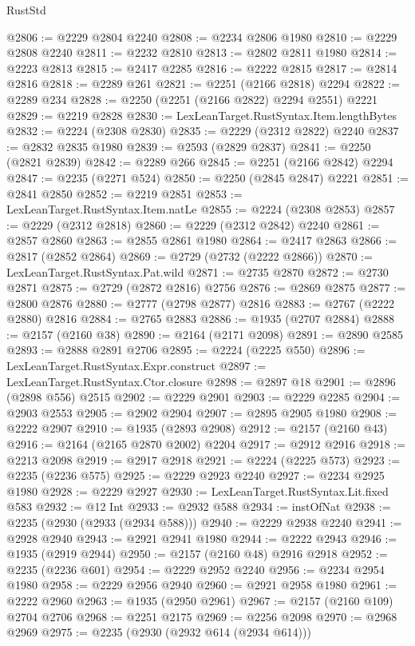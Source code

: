 \begin{lexlean}{RustStd}
\begin{coremodule}
@2806 := @2229 @2804 @2240
@2808 := @2234 @2806 @1980
@2810 := @2229 @2808 @2240
@2811 := @2232 @2810
@2813 := @2802 @2811 @1980
@2814 := @2223 @2813
@2815 := @2417 @2285
@2816 := @2222 @2815
@2817 := @2814 @2816
@2818 := @2289 @261
@2821 := @2251 (@2166 @2818) @2294
@2822 := @2289 @234
@2828 := @2250 (@2251 (@2166 @2822) @2294 @2551) @2221
@2829 := @2219 @2828
@2830 := LexLeanTarget.RustSyntax.Item.lengthBytes
@2832 := @2224 (@2308 @2830)
@2835 := @2229 (@2312 @2822) @2240
@2837 := @2832 @2835 @1980
@2839 := @2593 (@2829 @2837)
@2841 := @2250 (@2821 @2839)
@2842 := @2289 @266
@2845 := @2251 (@2166 @2842) @2294
@2847 := @2235 (@2271 @524)
@2850 := @2250 (@2845 @2847) @2221
@2851 := @2841 @2850
@2852 := @2219 @2851
@2853 := LexLeanTarget.RustSyntax.Item.natLe
@2855 := @2224 (@2308 @2853)
@2857 := @2229 (@2312 @2818)
@2860 := @2229 (@2312 @2842) @2240
@2861 := @2857 @2860
@2863 := @2855 @2861 @1980
@2864 := @2417 @2863
@2866 := @2817 (@2852 @2864)
@2869 := @2729 (@2732 (@2222 @2866))
@2870 := LexLeanTarget.RustSyntax.Pat.wild
@2871 := @2735 @2870
@2872 := @2730 @2871
@2875 := @2729 (@2872 @2816) @2756
@2876 := @2869 @2875
@2877 := @2800 @2876
@2880 := @2777 (@2798 @2877) @2816
@2883 := @2767 (@2222 @2880) @2816
@2884 := @2765 @2883
@2886 := @1935 (@2707 @2884)
@2888 := @2157 (@2160 @38)
@2890 := @2164 (@2171 @2098)
@2891 := @2890 @2585
@2893 := @2888 @2891 @2706
@2895 := @2224 (@2225 @550)
@2896 := LexLeanTarget.RustSyntax.Expr.construct
@2897 := LexLeanTarget.RustSyntax.Ctor.closure
@2898 := @2897 @18
@2901 := @2896 (@2898 @556) @2515
@2902 := @2229 @2901
@2903 := @2229 @2285
@2904 := @2903 @2553
@2905 := @2902 @2904
@2907 := @2895 @2905 @1980
@2908 := @2222 @2907
@2910 := @1935 (@2893 @2908)
@2912 := @2157 (@2160 @43)
@2916 := @2164 (@2165 @2870 @2002) @2204
@2917 := @2912 @2916
@2918 := @2213 @2098
@2919 := @2917 @2918
@2921 := @2224 (@2225 @573)
@2923 := @2235 (@2236 @575)
@2925 := @2229 @2923 @2240
@2927 := @2234 @2925 @1980
@2928 := @2229 @2927
@2930 := LexLeanTarget.RustSyntax.Lit.fixed @583
@2932 := @12 Int
@2933 := @2932 @588
@2934 := instOfNat
@2938 := @2235 (@2930 (@2933 (@2934 @588)))
@2940 := @2229 @2938 @2240
@2941 := @2928 @2940
@2943 := @2921 @2941 @1980
@2944 := @2222 @2943
@2946 := @1935 (@2919 @2944)
@2950 := @2157 (@2160 @48) @2916 @2918
@2952 := @2235 (@2236 @601)
@2954 := @2229 @2952 @2240
@2956 := @2234 @2954 @1980
@2958 := @2229 @2956 @2940
@2960 := @2921 @2958 @1980
@2961 := @2222 @2960
@2963 := @1935 (@2950 @2961)
@2967 := @2157 (@2160 @109) @2704 @2706
@2968 := @2251 @2175
@2969 := @2256 @2098
@2970 := @2968 @2969
@2975 := @2235 (@2930 (@2932 @614 (@2934 @614)))

\end{coremodule}
\end{lexlean}
